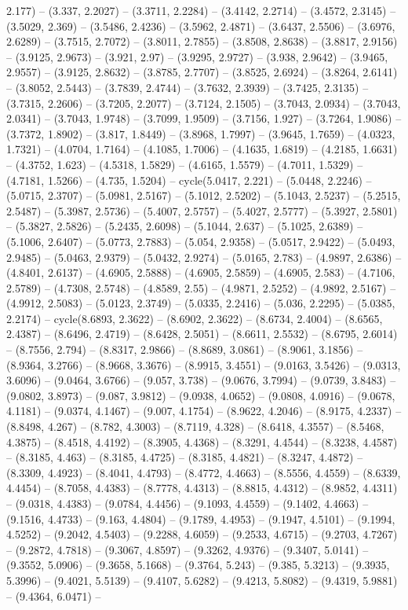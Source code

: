 2.177) -- (3.337, 2.2027) -- (3.3711, 2.2284) -- (3.4142, 2.2714) -- (3.4572, 2.3145) -- (3.5029, 2.369) -- (3.5486, 2.4236) -- (3.5962, 2.4871) -- (3.6437, 2.5506) -- (3.6976, 2.6289) -- (3.7515, 2.7072) -- (3.8011, 2.7855) -- (3.8508, 2.8638) -- (3.8817, 2.9156) -- (3.9125, 2.9673) -- (3.921, 2.97) -- (3.9295, 2.9727) -- (3.938, 2.9642) -- (3.9465, 2.9557) -- (3.9125, 2.8632) -- (3.8785, 2.7707) -- (3.8525, 2.6924) -- (3.8264, 2.6141) -- (3.8052, 2.5443) -- (3.7839, 2.4744) -- (3.7632, 2.3939) -- (3.7425, 2.3135) -- (3.7315, 2.2606) -- (3.7205, 2.2077) -- (3.7124, 2.1505) -- (3.7043, 2.0934) -- (3.7043, 2.0341) -- (3.7043, 1.9748) -- (3.7099, 1.9509) -- (3.7156, 1.927) -- (3.7264, 1.9086) -- (3.7372, 1.8902) -- (3.817, 1.8449) -- (3.8968, 1.7997) -- (3.9645, 1.7659) -- (4.0323, 1.7321) -- (4.0704, 1.7164) -- (4.1085, 1.7006) -- (4.1635, 1.6819) -- (4.2185, 1.6631) -- (4.3752, 1.623) -- (4.5318, 1.5829) -- (4.6165, 1.5579) -- (4.7011, 1.5329) -- (4.7181, 1.5266) -- (4.735, 1.5204) -- cycle(5.0417, 2.221) -- (5.0448, 2.2246) -- (5.0715, 2.3707) -- (5.0981, 2.5167) -- (5.1012, 2.5202) -- (5.1043, 2.5237) -- (5.2515, 2.5487) -- (5.3987, 2.5736) -- (5.4007, 2.5757) -- (5.4027, 2.5777) -- (5.3927, 2.5801) -- (5.3827, 2.5826) -- (5.2435, 2.6098) -- (5.1044, 2.637) -- (5.1025, 2.6389) -- (5.1006, 2.6407) -- (5.0773, 2.7883) -- (5.054, 2.9358) -- (5.0517, 2.9422) -- (5.0493, 2.9485) -- (5.0463, 2.9379) -- (5.0432, 2.9274) -- (5.0165, 2.783) -- (4.9897, 2.6386) -- (4.8401, 2.6137) -- (4.6905, 2.5888) -- (4.6905, 2.5859) -- (4.6905, 2.583) -- (4.7106, 2.5789) -- (4.7308, 2.5748) -- (4.8589, 2.55) -- (4.9871, 2.5252) -- (4.9892, 2.5167) -- (4.9912, 2.5083) -- (5.0123, 2.3749) -- (5.0335, 2.2416) -- (5.036, 2.2295) -- (5.0385, 2.2174) -- cycle(8.6893, 2.3622) -- (8.6902, 2.3622) -- (8.6734, 2.4004) -- (8.6565, 2.4387) -- (8.6496, 2.4719) -- (8.6428, 2.5051) -- (8.6611, 2.5532) -- (8.6795, 2.6014) -- (8.7556, 2.794) -- (8.8317, 2.9866) -- (8.8689, 3.0861) -- (8.9061, 3.1856) -- (8.9364, 3.2766) -- (8.9668, 3.3676) -- (8.9915, 3.4551) -- (9.0163, 3.5426) -- (9.0313, 3.6096) -- (9.0464, 3.6766) -- (9.057, 3.738) -- (9.0676, 3.7994) -- (9.0739, 3.8483) -- (9.0802, 3.8973) -- (9.087, 3.9812) -- (9.0938, 4.0652) -- (9.0808, 4.0916) -- (9.0678, 4.1181) -- (9.0374, 4.1467) -- (9.007, 4.1754) -- (8.9622, 4.2046) -- (8.9175, 4.2337) -- (8.8498, 4.267) -- (8.782, 4.3003) -- (8.7119, 4.328) -- (8.6418, 4.3557) -- (8.5468, 4.3875) -- (8.4518, 4.4192) -- (8.3905, 4.4368) -- (8.3291, 4.4544) -- (8.3238, 4.4587) -- (8.3185, 4.463) -- (8.3185, 4.4725) -- (8.3185, 4.4821) -- (8.3247, 4.4872) -- (8.3309, 4.4923) -- (8.4041, 4.4793) -- (8.4772, 4.4663) -- (8.5556, 4.4559) -- (8.6339, 4.4454) -- (8.7058, 4.4383) -- (8.7778, 4.4313) -- (8.8815, 4.4312) -- (8.9852, 4.4311) -- (9.0318, 4.4383) -- (9.0784, 4.4456) -- (9.1093, 4.4559) -- (9.1402, 4.4663) -- (9.1516, 4.4733) -- (9.163, 4.4804) -- (9.1789, 4.4953) -- (9.1947, 4.5101) -- (9.1994, 4.5252) -- (9.2042, 4.5403) -- (9.2288, 4.6059) -- (9.2533, 4.6715) -- (9.2703, 4.7267) -- (9.2872, 4.7818) -- (9.3067, 4.8597) -- (9.3262, 4.9376) -- (9.3407, 5.0141) -- (9.3552, 5.0906) -- (9.3658, 5.1668) -- (9.3764, 5.243) -- (9.385, 5.3213) -- (9.3935, 5.3996) -- (9.4021, 5.5139) -- (9.4107, 5.6282) -- (9.4213, 5.8082) -- (9.4319, 5.9881) -- (9.4364, 6.0471) -- 